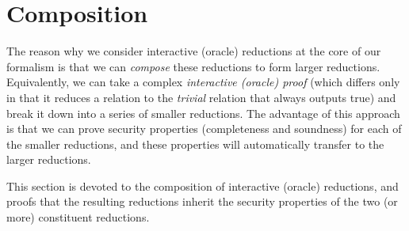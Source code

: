 \begin{definition}
    \label{def:state_function}
\end{definition}

\begin{definition}
    \label{def:round_by_round_soundness}
\end{definition}

\begin{definition}
    \label{def:round_by_round_knowledge_soundness}
\end{definition}

\section{Composition}

The reason why we consider interactive (oracle) reductions at the core of our formalism is that we can \emph{compose} these reductions to form larger reductions. Equivalently, we can take a complex \emph{interactive (oracle) proof} (which differs only in that it reduces a relation to the \emph{trivial} relation that always outputs true) and break it down into a series of smaller reductions. The advantage of this approach is that we can prove security properties (completeness and soundness) for each of the smaller reductions, and these properties will automatically transfer to the larger reductions.

This section is devoted to the composition of interactive (oracle) reductions, and proofs that the resulting reductions inherit the security properties of the two (or more) constituent reductions.




